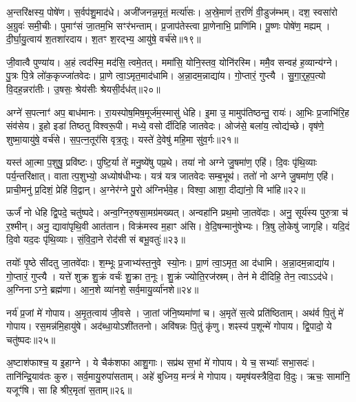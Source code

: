 अ॒न्तरि॑क्षस्य॒ पोषे॑ण।
स॒र्वप॑शु॒माद॑धे।
अजी॑जनन्न॒मृतं॒ मर्त्या॑सः।
अ॒स्रे॒माणं॑ त॒रणिं॑ वी॒डुज॑म्भम्।
दश॒ स्वसा॑रो अ॒ग्रुवः॑ समी॒चीः।
पुमाꣳ॑सं जा॒तम॒भि सꣳर॑भन्ताम्।
प्र॒जाप॑तेस्त्वा प्रा॒णेनाभि॒ प्राणि॑मि।
पू॒ष्णः पोषे॑ण॒ मह्यम्।
दी॒र्घा॒यु॒त्वाय॑ श॒तशा॑रदाय।
श॒तꣳ श॒रद्भ्य॒ आयु॑षे॒ वर्च॑से॥१९॥

जी॒वात्वै पुण्या॑य।
अ॒हं त्वद॑स्मि॒ मद॑सि॒ त्वमे॒तत्।
ममा॑सि॒ योनि॒स्तव॒ योनि॑रस्मि।
ममै॒व सन्वह॑ ह॒व्यान्य॑ग्ने।
पु॒त्रः पि॒त्रे लो॑क॒कृज्जा॑तवेदः।
प्रा॒णे त्वा॒\-ऽमृत॒माद॑धामि।
अ॒न्ना॒दम॒न्नाद्या॑य।
गो॒प्तारं॒ गुप्त्यै।
सु॒गा॒र्॒ह॒प॒त्यो वि॒दह॒न्नरा॑तीः।
उ॒षसः॒ श्रेय॑सीः श्रेयसी॒र्दध॑त्॥२०॥

अग्ने॑ स॒पत्नाꣳ॑ अप॒ बाध॑मानः।
रा॒यस्पोष॒मिष॒मूर्ज॑म॒स्मासु॑ धेहि।
इ॒मा उ॒ मामुप॑तिष्ठन्तु॒ रायः॑।
आ॒भिः प्र॒जाभि॑रि॒ह संव॑सेय।
इ॒हो इडा॑ तिष्ठतु विश्वरू॒पी।
मध्ये॒ वसोर्दीदिहि जातवेदः।
ओज॑से॒ बला॑य॒ त्वोद्य॑च्छे।
वृष॑णे॒ शुष्मा॒यायु॑षे॒ वर्च॑से।
स॒प॒त्न॒तूर॑सि वृत्र॒तूः।
यस्ते॑ दे॒वेषु॑ महि॒मा सु॑व॒र्गः॥२१॥

यस्त॑ आ॒त्मा प॒शुषु॒ प्रवि॑ष्टः।
पुष्टि॒र्या ते॑ मनु॒ष्ये॑षु पप्र॒थे।
तया॑ नो अग्ने जु॒षमा॑ण॒ एहि॑।
दि॒वः पृ॑थि॒व्याः पर्य॒न्तरि॑क्षात्।
वातात्प॒शुभ्यो॒ अध्योष॑धीभ्यः।
यत्र॑ यत्र जातवेदः सम्ब॒भूथ॑।
ततो॑ नो अग्ने जु॒षमा॑ण॒ एहि॑।
प्राची॒मनु॑ प्र॒दिशं॒ प्रेहि॑ वि॒द्वान्।
अ॒ग्नेर॑ग्ने पु॒रो अ॑ग्निर्भवे॒ह।
विश्वा॒ आशा॒ दीद्या॑नो॒ वि भा॑हि॥२२॥

ऊर्जं॑ नो धेहि द्वि॒पदे॒ चतु॑ष्पदे।
अन्व॒ग्निरु॒षसा॒मग्र॑मख्यत्।
अन्वहा॑नि प्रथ॒मो जा॒तवे॑दाः।
अनु॒ सूर्य॑स्य पुरु॒त्रा च॑ र॒श्मीन्।
अनु॒ द्यावा॑पृथि॒वी आत॑तान।
विक्र॑मस्व म॒हाꣳ अ॑सि।
वे॒दि॒षन्मानु॑षेभ्यः।
त्रि॒षु लो॒केषु॑ जागृहि।
यदि॒दं दि॒वो यद॒दः पृ॑थि॒व्याः।
सं॒वि॒दा॒ने रोद॑सी सं बभू॒वतुः॑॥२३॥

तयोः᳚ पृ॒ष्ठे सी॑दतु जा॒तवे॑दाः।
श॒म्भूः प्र॒जाभ्य॑स्त॒नुवे स्यो॒नः।
प्रा॒णं त्वा॒\-ऽमृत॒ आ द॑धामि।
अ॒न्ना॒दम॒न्नाद्या॑य।
गो॒प्तारं॒ गुप्त्यै।
यत्ते॑ शुक्र शु॒क्रं वर्चः॑ शु॒क्रा त॒नूः।
शु॒क्रं ज्योति॒रज॑स्रम्।
तेन॑ मे दीदिहि॒ तेन॒ त्वाऽऽद॑धे।
अ॒ग्निना\-ऽग्ने॒ ब्रह्म॑णा।
आ॒न॒शे व्या॑नशे॒ सर्व॒मायु॒र्व्या॑नशे॥२४॥

नर्य॑ प्र॒जां मे॑ गोपाय।
अ॒मृ॒त॒त्वाय॑ जी॒वसे।
जा॒तां ज॑नि॒ष्यमा॑णां च।
अ॒मृते॑ स॒त्ये प्रति॑ष्ठिताम्।
अथ॑र्व पि॒तुं मे॑ गोपाय।
रस॒मन्न॑मि॒हायु॑षे।
अद॑ब्धा॒यो\-ऽशी॑ततनो।
अवि॑षन्नः पि॒तुं कृ॑णु।
शꣴस्य॑ प॒शून्मे॑ गोपाय।
द्वि॒पादो॒ ये चतु॑ष्पदः॥२५॥

अ॒ष्टाश॑फाश्च॒ य इ॒हाग्ने।
ये चैक॑शफा आशु॒गाः।
सप्र॑थ स॒भां मे॑ गोपाय।
ये च॒ सभ्याः᳚ सभा॒सदः॑।
तानि॑न्द्रि॒याव॑तः कुरु।
सर्व॒मायु॒रुपा॑सताम्।
अहे॑ बुध्निय॒ मन्त्रं॑ मे गोपाय।
यमृष॑यस्त्रैवि॒दा वि॒दुः।
ऋचः॒ सामा॑नि॒ यजूꣳ॑षि।
सा हि श्रीर॒मृता॑ स॒ताम्॥२६॥


